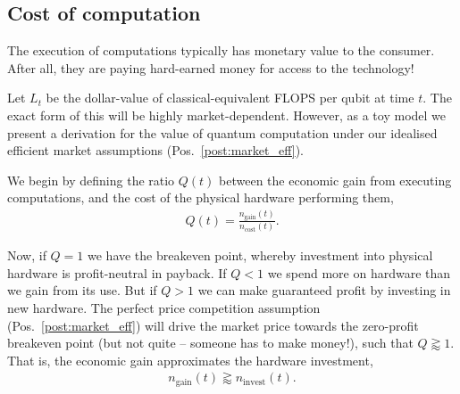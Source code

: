 \documentclass[aps, rmp, twocolumn, amsmath, amssymb, nofootinbib, superscriptaddress, longbibliography, floatfix, table-of-contents, eqsecnum]{revtex4-1}
\begin{document}
%
%

\subsection{Cost of computation} 

The execution of computations typically has monetary value to the consumer. After all, they are paying hard-earned money for access to the technology!

Let $L_t$ be the dollar-value of classical-equivalent FLOPS per qubit at time $t$. The exact form of this will be highly market-dependent. However, as a toy model we present a derivation for the value of quantum computation under our idealised efficient market assumptions (Pos.~\ref{post:market_eff}).

We begin by defining the ratio $Q(t)$ between the economic gain from executing computations, and the cost of the physical hardware performing them,
\begin{align}
Q(t)=\frac{n_\text{gain}(t)}{n_\text{cost}(t)}.
\end{align}

Now, if \mbox{$Q=1$} we have the breakeven point, whereby investment into physical hardware is profit-neutral in payback. If \mbox{$Q<1$} we spend more on hardware than we gain from its use. But if \mbox{$Q>1$} we can make guaranteed profit by investing in new hardware. The perfect price competition assumption (Pos.~\ref{post:market_eff}) will drive the market price towards the zero-profit breakeven point (but not quite -- someone has to make money!), such that \mbox{$Q\gtrapprox 1$}. That is, the economic gain approximates the hardware investment,
\begin{align} \label{sec:gain_eq_invest}
	n_\text{gain}(t) \gtrapprox n_\text{invest}(t).
\end{align}
\end{document}

